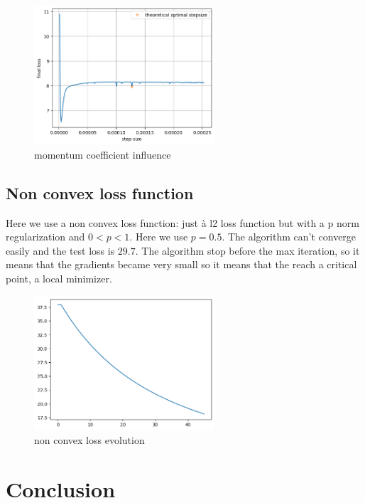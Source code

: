 \documentclass{article}
\begin{document}
    \begin{figure}[!h]
    \centering
    \includegraphics[width=0.6\textwidth]{images/part7_3.png}
    \caption{momentum coefficient influence}
    \label{fig:sg3}
    \end{figure}      
  
    
    \subsection{Non convex loss function}

    Here we use a non convex loss function: just à l2 loss function but with a p norm regularization and $0<p<1$. Here we use $p = 0.5$. The algorithm can't converge easily and the test loss is $29.7$. The algorithm stop before the max iteration, so it means that the gradients became very small so it means that the reach a critical point, a local minimizer.

    \begin{figure}[!h]
    \centering
    \includegraphics[width=0.6\textwidth]{images/part7_34.png}
    \caption{non convex loss evolution}
    \label{fig:sg3}
    \end{figure}       
\newpage

\section*{Conclusion}
\end{document}
